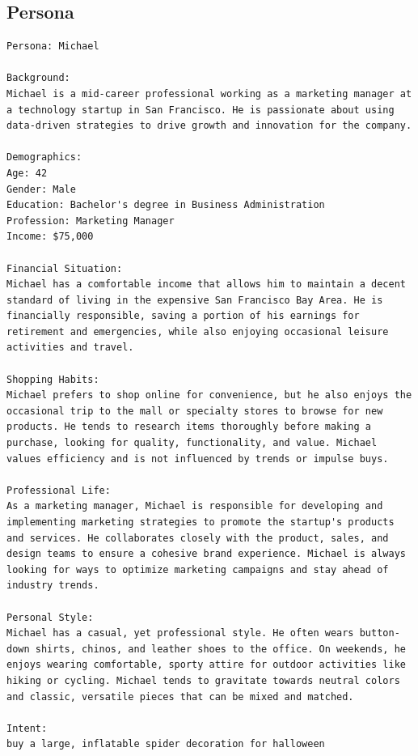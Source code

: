 \documentclass[manuscript,review,anonymous]{acmart}
\begin{document}
\subsection{Persona}
\label{sec:example-persona}
\begin{verbatim}
Persona: Michael

Background:
Michael is a mid-career professional working as a marketing manager at a technology startup in San Francisco. He is passionate about using data-driven strategies to drive growth and innovation for the company.

Demographics:
Age: 42
Gender: Male
Education: Bachelor's degree in Business Administration
Profession: Marketing Manager
Income: $75,000

Financial Situation:
Michael has a comfortable income that allows him to maintain a decent standard of living in the expensive San Francisco Bay Area. He is financially responsible, saving a portion of his earnings for retirement and emergencies, while also enjoying occasional leisure activities and travel.

Shopping Habits:
Michael prefers to shop online for convenience, but he also enjoys the occasional trip to the mall or specialty stores to browse for new products. He tends to research items thoroughly before making a purchase, looking for quality, functionality, and value. Michael values efficiency and is not influenced by trends or impulse buys.

Professional Life:
As a marketing manager, Michael is responsible for developing and implementing marketing strategies to promote the startup's products and services. He collaborates closely with the product, sales, and design teams to ensure a cohesive brand experience. Michael is always looking for ways to optimize marketing campaigns and stay ahead of industry trends.

Personal Style:
Michael has a casual, yet professional style. He often wears button-down shirts, chinos, and leather shoes to the office. On weekends, he enjoys wearing comfortable, sporty attire for outdoor activities like hiking or cycling. Michael tends to gravitate towards neutral colors and classic, versatile pieces that can be mixed and matched.

Intent:
buy a large, inflatable spider decoration for halloween

\end{verbatim}
\end{document}
